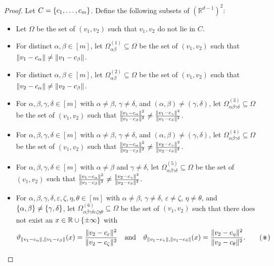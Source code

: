 \documentclass[11pt]{amsart}
\theoremstyle{definition}
\DeclarePairedDelimiter{\set}{\{}{\}}
\DeclarePairedDelimiter{\Abs}{\lVert}{\rVert}
\newcommand{\eps}{\varepsilon}
\newcommand{\RR}{\mathbb{R}}
\begin{document}
\begin{proof}
Let $C=\set{c_1, \ldots, c_m}$.  Define the following subsets of $(\RR^{d-1})^2$:
\begin{itemize}
    \item Let $\Omega$ be the set of $(v_1,v_2)$ such that $v_1,v_2$ do not lie in $C$.
    \item For distinct $\alpha,\beta \in [m]$, let $\Omega^{(1)}_{\alpha\beta} \subseteq \Omega$ be the set of $(v_1,v_2)$ such that $\Abs{v_1 - c_\alpha} \neq \Abs{v_1 - c_\beta}$.
    \item For distinct $\alpha,\beta \in [m]$, let $\Omega^{(2)}_{\alpha\beta} \subseteq \Omega$ be the set of $(v_1,v_2)$ such that $\Abs{v_2 - c_\alpha} \neq \Abs{v_2 - c_\beta}$.
    \item For $\alpha,\beta,\gamma,\delta\in [m]$ with $\alpha \neq \beta$, $\gamma \neq \delta$, and $(\alpha,\beta)\neq(\gamma,\delta)$, let $\Omega^{(3)}_{\alpha\beta\gamma\delta} \subseteq \Omega$ be the set of $(v_1,v_2)$ such that $\frac{\Abs{v_1 - c_\alpha}^2}{\Abs{v_1 - c_\beta}^2} \neq \frac{\Abs{v_1 - c_\gamma}^2}{\Abs{v_1 - c_\delta}^2}$.
    \item For $\alpha,\beta,\gamma,\delta\in [m]$ with $\alpha \neq \beta$, $\gamma \neq \delta$, and $(\alpha,\beta)\neq(\gamma,\delta)$, let $\Omega^{(4)}_{\alpha\beta\gamma\delta} \subseteq \Omega$ be the set of $(v_1,v_2)$ such that $\frac{\Abs{v_2 - c_\alpha}^2}{\Abs{v_2 - c_\beta}^2}\neq \frac{\Abs{v_2 - c_\gamma}^2}{\Abs{v_2 - c_\delta}^2}$.
    \item For $\alpha,\beta,\gamma,\delta\in [m]$ with $\alpha \neq \beta$ and $\gamma \neq \delta$, let $\Omega^{(5)}_{\alpha\beta\gamma\delta} \subseteq \Omega$ be the set of $(v_1,v_2)$ such that $\frac{\Abs{v_1 - c_\alpha}^2}{\Abs{v_1 - c_\beta}^2} \neq \frac{\Abs{v_2 - c_\gamma}^2}{\Abs{v_2 - c_\delta}^2}$.
    \item For $\alpha,\beta,\gamma,\delta,\eps,\zeta,\eta,\theta \in [m]$ with $\alpha \neq \beta$, $\gamma \neq \delta$, $\eps \neq \zeta$, $\eta \neq \theta$, and $\set{\alpha,\beta} \neq \set{\gamma,\delta}$, let $\Omega^{(6)}_{\alpha\beta\gamma\delta\eps\zeta\eta\theta} \subseteq \Omega$ be the set of $(v_1,v_2)$ such that there does not exist an $x \in \RR \cup \set{\pm \infty}$ with
    \[ \vartheta_{\Abs{v_1-c_\alpha},\Abs{v_1-c_\beta}}(x) = \frac{\Abs{v_2 - c_\eps}^2}{\Abs{v_2 - c_\zeta}^2}\quad\text{and}\quad\vartheta_{\Abs{v_1-c_\gamma},\Abs{v_1-c_\delta}}(x) = \frac{\Abs{v_2 - c_\eta}^2}{\Abs{v_2 - c_\theta}^2}.\tag{$\divideontimes$}\label{eq:omega-6}\]
\end{itemize}


\end{proof}
\end{document}
